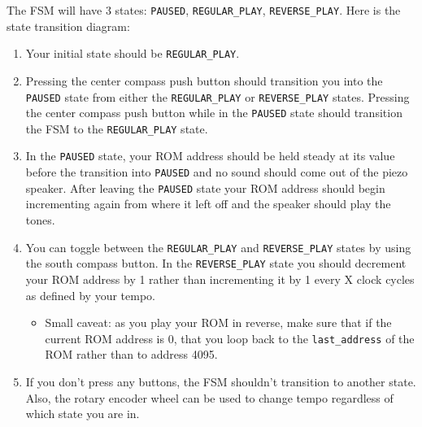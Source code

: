 \documentclass[11pt]{article}
\begin{document}
The FSM will have 3 states: \verb|PAUSED|, \verb|REGULAR_PLAY|, \verb|REVERSE_PLAY|. Here is the state transition diagram:

\begin{center}
\end{center}

\begin{enumerate}
	\item Your initial state should be \verb|REGULAR_PLAY|. 
	
	\item Pressing the center compass push button should transition you into the \verb|PAUSED| state from either the \verb|REGULAR_PLAY| or \verb|REVERSE_PLAY| states. Pressing the center compass push button while in the \verb|PAUSED| state should transition the FSM to the \verb|REGULAR_PLAY| state.
	
	\item In the \verb|PAUSED| state, your ROM address should be held steady at its value before the transition into \verb|PAUSED| and no sound should come out of the piezo speaker. After leaving the \verb|PAUSED| state your ROM address should begin incrementing again from where it left off and the speaker should play the tones.
	
	\item You can toggle between the \verb|REGULAR_PLAY| and \verb|REVERSE_PLAY| states by using the south compass button. In the \verb|REVERSE_PLAY| state you should decrement your ROM address by 1 rather than incrementing it by 1 every X clock cycles as defined by your tempo.
	
	\begin{itemize}
		\item Small caveat: as you play your ROM in reverse, make sure that if the current ROM address is 0, that you loop back to the \verb|last_address| of the ROM rather than to address 4095.
	\end{itemize}
	
	\item If you don't press any buttons, the FSM shouldn't transition to another state. Also, the rotary encoder wheel can be used to change tempo regardless of which state you are in.
\end{enumerate}
\end{document}
